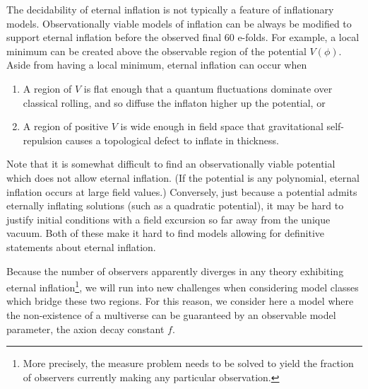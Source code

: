 \documentclass[aps,amsfonts,amsmath,prd,preprint,nofootinbib,superscriptaddress]{revtex4}
\begin{document}
The decidability of eternal inflation is not typically a feature of inflationary models.
 Observationally viable models of inflation can be always be modified to support eternal inflation before the observed final 60 e-folds.   
 For example, a local minimum can be created above the observable region of the potential $V(\phi)$.
 Aside from having a local minimum, eternal inflation can occur when
 \begin{enumerate}
 \item A region of $V$ is flat enough that a quantum fluctuations dominate over classical rolling, and so diffuse the inflaton higher up the potential, or
 \item A region of positive $V$ is wide enough in field space that gravitational self-repulsion causes a topological defect to inflate in thickness.
 \end{enumerate}
 
 Note that it is somewhat difficult to find an observationally viable potential which does not allow eternal inflation\cite{Mukhanov:2014uwa}.  (If the
potential is any polynomial, eternal inflation occurs at large field values.) %
Conversely, just because a potential admits eternally inflating solutions (such as a quadratic potential), it may be hard to justify initial conditions with a field excursion so far away from the unique vacuum.  
Both of these make it hard to find models allowing for definitive statements about eternal inflation.

 
 
Because the number of observers apparently diverges in any theory exhibiting eternal inflation\footnote{More precisely, 
the measure problem needs to be solved to yield the fraction of observers currently making any particular observation.}, 
we will run into new challenges when considering model classes which bridge these two regions.  
For this reason, we consider here a model where the non-existence of a multiverse can be guaranteed by an observable model parameter,  the axion decay constant $f$.
\end{document}
